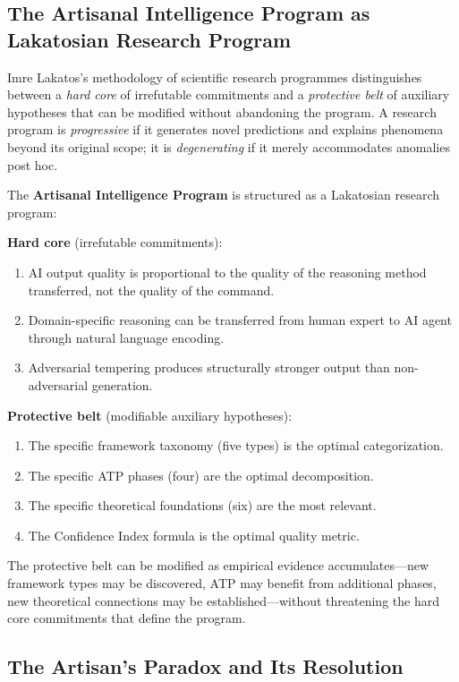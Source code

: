 \documentclass[12pt,a4paper]{article}
\begin{document}
\subsection{The Artisanal Intelligence Program as Lakatosian Research Program}

Imre Lakatos's methodology of scientific research programmes \cite{lakatos1978} distinguishes between a \emph{hard core} of irrefutable commitments and a \emph{protective belt} of auxiliary hypotheses that can be modified without abandoning the program. A research program is \emph{progressive} if it generates novel predictions and explains phenomena beyond its original scope; it is \emph{degenerating} if it merely accommodates anomalies post hoc.

The \textbf{Artisanal Intelligence Program} is structured as a Lakatosian research program:

\textbf{Hard core} (irrefutable commitments):
\begin{enumerate}
  \item AI output quality is proportional to the quality of the reasoning method transferred, not the quality of the command.
  \item Domain-specific reasoning can be transferred from human expert to AI agent through natural language encoding.
  \item Adversarial tempering produces structurally stronger output than non-adversarial generation.
\end{enumerate}

\textbf{Protective belt} (modifiable auxiliary hypotheses):
\begin{enumerate}
  \item The specific framework taxonomy (five types) is the optimal categorization.
  \item The specific ATP phases (four) are the optimal decomposition.
  \item The specific theoretical foundations (six) are the most relevant.
  \item The Confidence Index formula is the optimal quality metric.
\end{enumerate}

The protective belt can be modified as empirical evidence accumulates---new framework types may be discovered, ATP may benefit from additional phases, new theoretical connections may be established---without threatening the hard core commitments that define the program.

\subsection{The Artisan's Paradox and Its Resolution}
\end{document}
